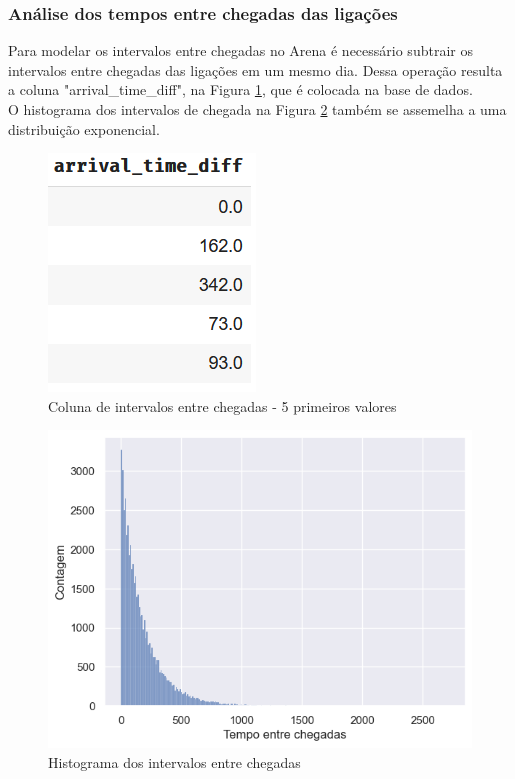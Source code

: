 \subsubsection{Análise dos tempos entre chegadas das ligações}
Para modelar os intervalos entre chegadas no Arena é necessário subtrair os intervalos entre chegadas das ligações em um mesmo dia. Dessa operação resulta a coluna "arrival\_time\_diff", na Figura \ref*{fig: df-intervalos}, que é colocada na base de dados. \\
O histograma dos intervalos de chegada na Figura \ref*{fig: hist-intervalos} também se assemelha a uma distribuição exponencial.

\begin{figure}[H]
    \centering
    \includegraphics{analise-de-dados/anual/df-arrivals.png}
    \caption{Coluna de intervalos entre chegadas - 5 primeiros valores}
    \label{fig: df-intervalos}
\end{figure}

\begin{figure}[H]
    \includegraphics{analise-de-dados/anual/hist-intervalos.png}
    \caption{Histograma dos intervalos entre chegadas}
    \label{fig: hist-intervalos}
\end{figure}

